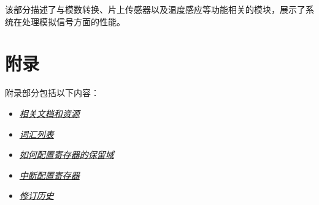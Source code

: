 \documentclass[openany, 10pt]{book}
\begin{document}
该部分描述了与模数转换、片上传感器以及温度感应等功能相关的模块，展示了系统在处理模拟信号方面的性能。




\part{附录}\label{appendix}

附录部分包括以下内容：

\begin{itemize}
    \item \hyperref[sec:resources]{\textit{相关文档和资源}}
    \item \hyperref[glossary]{\textit{词汇列表}}
    \item \hyperref[programming-reserved-field]{\textit{如何配置寄存器的保留域}}
    \item \hyperref[interrupt-config-registers]{\textit{中断配置寄存器}}
    \item \hyperref[revision-history]{\textit{修订历史}}
\end{itemize}



\clearpage


\clearpage


\clearpage


\clearpage


\clearpage


\clearpage

\end{document}
